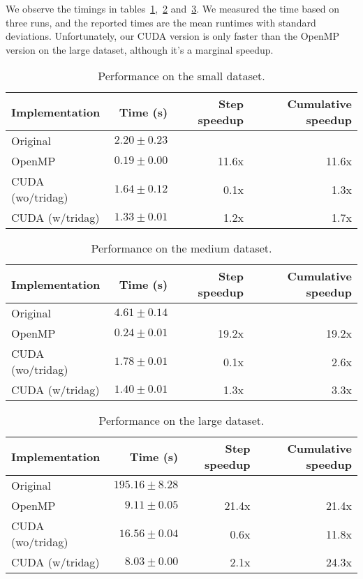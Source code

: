 \documentclass[a4paper]{article}
\begin{document}
We observe the timings in tables~\ref{tbl:time_small},~\ref{tbl:time_medium}
and~\ref{tbl:time_large}. We measured the time based on three runs, and the
reported times are the mean runtimes with standard deviations. Unfortunately,
our CUDA version is only faster than the OpenMP version on the large dataset,
although it's a marginal speedup.

\begin{table}
    \centering
    \begin{tabular}{lrrr}
        \toprule
        \textbf{Implementation} & \textbf{Time (s)} & \textbf{Step speedup} & \textbf{Cumulative speedup} \\
        \midrule
        Original         & $2.20\pm0.23$ &       &       \\
        OpenMP           & $0.19\pm0.00$ & 11.6x & 11.6x \\
        CUDA (wo/tridag) & $1.64\pm0.12$ &  0.1x &  1.3x \\
        CUDA (w/tridag)  & $1.33\pm0.01$ &  1.2x &  1.7x \\
        \bottomrule
    \end{tabular}
    \caption{Performance on the small dataset.}
    \label{tbl:time_small}
\end{table}

\begin{table}
    \centering
    \begin{tabular}{lrrr}
        \toprule
        \textbf{Implementation} & \textbf{Time (s)} & \textbf{Step speedup} & \textbf{Cumulative speedup} \\
        \midrule
        Original         & $4.61\pm0.14$ &       &       \\
        OpenMP           & $0.24\pm0.01$ & 19.2x & 19.2x \\
        CUDA (wo/tridag) & $1.78\pm0.01$ &  0.1x &  2.6x \\
        CUDA (w/tridag)  & $1.40\pm0.01$ &  1.3x &  3.3x \\
        \bottomrule
    \end{tabular}
    \caption{Performance on the medium dataset.}
    \label{tbl:time_medium}
\end{table}

\begin{table}
    \centering
    \begin{tabular}{lrrr}
        \toprule
        \textbf{Implementation} & \textbf{Time (s)} & \textbf{Step speedup} & \textbf{Cumulative speedup} \\
        \midrule
        Original         & $195.16\pm8.28$ &       &       \\
        OpenMP           &   $9.11\pm0.05$ & 21.4x & 21.4x \\
        CUDA (wo/tridag) &  $16.56\pm0.04$ &  0.6x & 11.8x \\
        CUDA (w/tridag)  &   $8.03\pm0.00$ &  2.1x & 24.3x \\
        \bottomrule
    \end{tabular}
    \caption{Performance on the large dataset.}
    \label{tbl:time_large}
\end{table}
\end{document}
